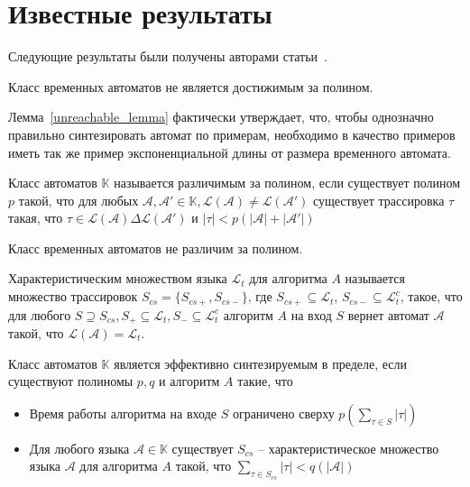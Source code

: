 \documentclass[times,specification,annotation]{itmo-student-thesis}
\begin{document}
\section{Известные результаты}
Следующие результаты были получены авторами статьи~\cite{1-dta}.

\begin{lemma}
  Класс временных автоматов не является достижимым за полином.
  \label{unreachable_lemma}
\end{lemma}

Лемма~\ref{unreachable_lemma} фактически утверждает, что, чтобы однозначно правильно синтезировать 
автомат по примерам, необходимо в качество примеров иметь так же пример экспоненциальной длины от размера временного автомата.

\begin{definition}
  Класс автоматов $\mathbb{K}$ называется различимым за полином, если существует полином $p$ такой, что для любых
  $\mathcal{A}, \mathcal{A'} \in \mathbb{K}, \mathcal{L}(\mathcal{A}) \neq \mathcal{L}(\mathcal{A'})$ существует трассировка $\tau$ такая, что 
  $\tau \in \mathcal{L}(\mathcal{A}) \Delta \mathcal{L}(\mathcal{A'})$ и $|\tau| < p(|\mathcal{A}| + |\mathcal{A'}|)$
\end{definition}

\begin{lemma}
  Класс временных автоматов не различим за полином.
  \label{distinguishability_lemma}
\end{lemma}

\begin{definition}
    Характеристическим множеством языка $\mathcal{L}_t$ для алгоритма $A$ называется множество трассировок $S_{cs} = \{S_{cs+}, S_{cs-}\}$, где
  $S_{cs+} \subseteq \mathcal{L}_t$, $S_{cs-} \subseteq \mathcal{L}_t^c$, такое, что 
  для любого $S \supseteq S_{cs}, S_+ \subseteq \mathcal{L}_t, S_- \subseteq \mathcal{L}_t^c$ алгоритм $A$ на вход $S$ вернет автомат $\mathcal{A}$ такой, что $\mathcal{L}(\mathcal{A}) = \mathcal{L}_t$.
\end{definition}

\begin{definition}
    Класс автоматов $\mathbb{K}$ является эффективно синтезируемым в пределе, если существуют полиномы $p, q$ и алгоритм $A$ такие, что
  \begin{itemize}
    \item Время работы алгоритма на входе $S$ ограничено сверху $p(\mathop{\sum}\limits_{\tau \in S}|\tau|)$
    \item Для любого языка $\mathcal{A} \in \mathbb{K}$ существует $S_{cs} $ 
      -- характеристическое множество языка $\mathcal{A}$ для алгоритма $A$ такой, что $\mathop{\sum}\limits_{\tau \in S_{cs}}|\tau| < q(|\mathcal{A}|)$
  \end{itemize}
\end{definition}
\end{document}

